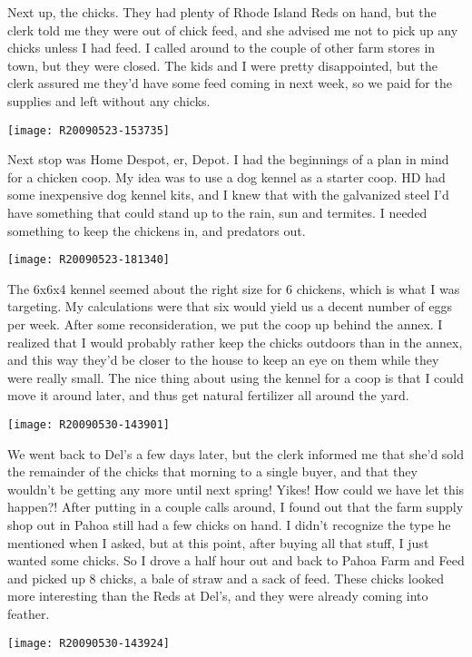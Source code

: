 Next up, the chicks.  They had plenty of Rhode Island Reds on hand, but
the clerk told me they were out of chick feed, and she advised me not to
pick up any chicks unless I had feed.  I called around to the couple of
other farm stores in town, but they were closed.  The kids and I were
pretty disappointed, but the clerk assured me they'd have some feed
coming in next week, so we paid for the supplies and left without any
chicks. 
\newpage

\texttt{[image: R20090523-153735]}

Next stop was Home Despot, er, Depot.  I had the beginnings of a plan in
mind for a chicken coop.  My idea was to use a dog kennel as a starter
coop.  HD had some inexpensive dog kennel kits, and I knew that with the
galvanized steel I'd have something that could stand up to the rain, sun
and termites.  I needed something to keep the chickens in, and predators
out. 
\newpage

\texttt{[image: R20090523-181340]}

The 6x6x4 kennel seemed about the right size for 6 chickens, which is
what I was targeting.  My calculations were that six would yield us a
decent number of eggs per week.  After some reconsideration, we put the
coop up behind the annex.  I realized that I would probably rather keep
the chicks outdoors than in the annex, and this way they'd be closer to
the house to keep an eye on them while they were really small.  The nice
thing about using the kennel for a coop is that I could move it around
later, and thus get natural fertilizer all around the yard. 
\newpage

\texttt{[image: R20090530-143901]}

We went back to Del's a few days later, but the clerk informed me that
she'd sold the remainder of the chicks that morning to a single buyer,
and that they wouldn't be getting any more until next spring! Yikes! How
could we have let this happen?! After putting in a couple calls around,
I found out that the farm supply shop out in Pahoa still had a few
chicks on hand. I didn't recognize the type he mentioned when I asked,
but at this point, after buying all that stuff, I just wanted some
chicks. So I drove a half hour out and back to Pahoa Farm and Feed and
picked up 8 chicks, a bale of straw and a sack of feed. These chicks
looked more interesting than the Reds at Del's, and they were already
coming into feather. 
\newpage

\texttt{[image: R20090530-143924]}

